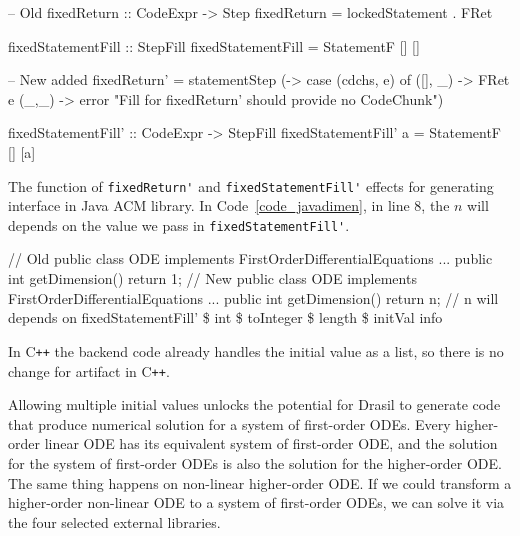 \begin{listing}[ht]
\begin{haskell1}
-- Old 
fixedReturn :: CodeExpr -> Step
fixedReturn = lockedStatement . FRet

fixedStatementFill :: StepFill
fixedStatementFill = StatementF [] []

-- New added 
fixedReturn' = statementStep (\cdchs [e] -> case (cdchs, e) of
  ([], _) -> FRet e
  (_,_) -> error "Fill for fixedReturn' should provide no CodeChunk")

fixedStatementFill' :: CodeExpr -> StepFill
fixedStatementFill' a = StatementF [] [a]
\end{haskell1}
\end{listing}
The function of \verb|fixedReturn'| and \verb|fixedStatementFill'| effects for generating interface in Java ACM library. In Code~\ref{code_javadimen}, in line 8, the $n$ will depends on the value we pass in \verb|fixedStatementFill'|.
\begin{listing}
\begin{java1}
// Old 
public class ODE implements FirstOrderDifferentialEquations {
  ...
  public int getDimension() {
    return 1;
  }
}
// New 
public class ODE implements FirstOrderDifferentialEquations {
  ...
  public int getDimension() {
    return n; // n will depends on fixedStatementFill' \$ int \$ toInteger \$ length \$ initVal info
  }
}
\end{java1}
\label{code_javadimen}
\end{listing}

In C\texttt{++} the backend code already handles the initial value as a list, so there is no change for artifact in C\texttt{++}.

Allowing multiple initial values unlocks the potential for Drasil to generate code that produce numerical solution for a system of first-order ODEs. Every higher-order linear ODE has its equivalent system of first-order ODE, and the solution for the system of first-order ODEs is also the solution for the higher-order ODE. The same thing happens on non-linear higher-order ODE. If we could transform a higher-order non-linear ODE to a system of first-order ODEs, we can solve it via the four selected external libraries. 

